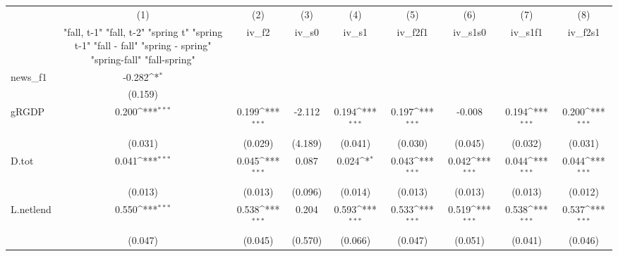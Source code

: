 {
\def\sym#1{\ifmmode^{#1}\else\(^{#1}\)\fi}
\begin{tabular}{l*{8}{c}}
\toprule
            &\multicolumn{1}{c}{(1)}&\multicolumn{1}{c}{(2)}&\multicolumn{1}{c}{(3)}&\multicolumn{1}{c}{(4)}&\multicolumn{1}{c}{(5)}&\multicolumn{1}{c}{(6)}&\multicolumn{1}{c}{(7)}&\multicolumn{1}{c}{(8)}\\
            &\multicolumn{1}{c}{  "fall, t-1" "fall, t-2" "spring t" "spring t-1"  "fall - fall" "spring - spring" "spring-fall" "fall-spring" }&\multicolumn{1}{c}{iv\_f2}&\multicolumn{1}{c}{iv\_s0}&\multicolumn{1}{c}{iv\_s1}&\multicolumn{1}{c}{iv\_f2f1}&\multicolumn{1}{c}{iv\_s1s0}&\multicolumn{1}{c}{iv\_s1f1}&\multicolumn{1}{c}{iv\_f2s1}\\
\midrule
news\_f1     &      -0.282\sym{*}  &                     &                     &                     &                     &                     &                     &                     \\
            &     (0.159)         &                     &                     &                     &                     &                     &                     &                     \\
\addlinespace
gRGDP       &       0.200\sym{***}&       0.199\sym{***}&      -2.112         &       0.194\sym{***}&       0.197\sym{***}&      -0.008         &       0.194\sym{***}&       0.200\sym{***}\\
            &     (0.031)         &     (0.029)         &     (4.189)         &     (0.041)         &     (0.030)         &     (0.045)         &     (0.032)         &     (0.031)         \\
\addlinespace
D.tot       &       0.041\sym{***}&       0.045\sym{***}&       0.087         &       0.024\sym{*}  &       0.043\sym{***}&       0.042\sym{***}&       0.044\sym{***}&       0.044\sym{***}\\
            &     (0.013)         &     (0.013)         &     (0.096)         &     (0.014)         &     (0.013)         &     (0.013)         &     (0.013)         &     (0.012)         \\
\addlinespace
L.netlend   &       0.550\sym{***}&       0.538\sym{***}&       0.204         &       0.593\sym{***}&       0.533\sym{***}&       0.519\sym{***}&       0.538\sym{***}&       0.537\sym{***}\\
            &     (0.047)         &     (0.045)         &     (0.570)         &     (0.066)         &     (0.047)         &     (0.051)         &     (0.041)         &     (0.046)         \\

\end{tabular}}
